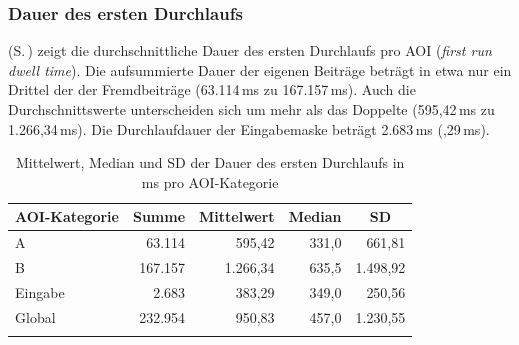 
\subsubsection{Dauer des ersten Durchlaufs}
\label{K6:subsubsec:iafrd:DD}\largerpage[-2]


\begin{sloppypar}
 (S.\,\pageref{K6:tab:DeDe:mean-sd-iafrd}) zeigt die durchschnittliche Dauer des ersten Durchlaufs pro AOI (\emph{first run dwell time}). Die aufsummierte Dauer der eigenen Beiträge beträgt in etwa nur ein Drittel der der Fremdbeiträge (63.114\,ms zu 167.157\,ms). Auch die Durchschnittswerte unterscheiden sich um mehr als das Doppelte (595,42\,ms zu 1.266,34\,ms). Die Durchlaufdauer der Eingabemaske beträgt 2.683\,ms (,29\,ms).\end{sloppypar}




\begin{table}
    \begin{tabular}{lrrrr}  
    \lsptoprule
        {AOI-Kategorie} & \multicolumn{1}{c}{Summe} & \multicolumn{1}{c}{Mittelwert} & \multicolumn{1}{c}{Median} & \multicolumn{1}{c}{SD} \\ 
        \midrule
        A   & 63.114 & 595,42 & 331,0 & 661,81 \\ 
        B   & 167.157 & 1.266,34 & 635,5 & 1.498,92 \\ 
        Eingabe   & 2.683 & 383,29 & 349,0 & 250,56 \\ 
        \midrule
        Global  & 232.954 & 950,83 &  457,0 & 1.230,55 \\ 
        \lspbottomrule
    \end{tabular}
    \caption[Mittelwert, Median und SD der Dauer des ersten Durchlaufs]
            {Mittelwert, Median und SD der Dauer des ersten Durchlaufs in ms pro AOI-Kategorie
            \label{K6:tab:DeDe:mean-sd-iafrd}}
\end{table}




